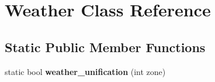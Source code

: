 \hypertarget{classWeather}{\section{Weather Class Reference}
\label{classWeather}
}
\subsection*{Static Public Member Functions}
\begin{DoxyCompactItemize}
\item 
\hypertarget{classWeather_ae86a7b871374468ff713e5dd2860438a}{static bool {\bfseries weather\-\_\-unification} (int zone)}\label{classWeather_ae86a7b871374468ff713e5dd2860438a}

\end{DoxyCompactItemize}
